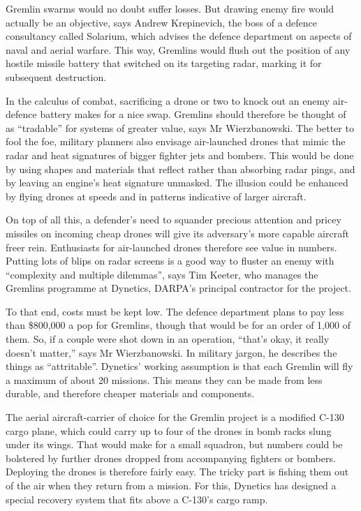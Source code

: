 \documentclass{article}
\begin{document}
Gremlin swarms would no doubt suffer losses. But drawing enemy fire would actually be an objective, says Andrew Krepinevich, the boss of a defence consultancy called Solarium, which advises the defence department on aspects of naval and aerial warfare. This way, Gremlins would flush out the position of any hostile missile battery that switched on its targeting radar, marking it for subsequent destruction. 

In the calculus of combat, sacrificing a drone or two to knock out an enemy air-defence battery makes for a nice swap. Gremlins should therefore be thought of as ``tradable'' for systems of greater value, says Mr Wierzbanowski. The better to fool the foe, military planners also envisage air-launched drones that mimic the radar and heat signatures of bigger fighter jets and bombers. This would be done by using shapes and materials that reflect rather than absorbing radar pings, and by leaving an engine's heat signature unmasked. The illusion could be enhanced by flying drones at speeds and in patterns indicative of larger aircraft. 

On top of all this, a defender's need to squander precious attention and pricey missiles on incoming cheap drones will give its adversary's more capable aircraft freer rein. Enthusiasts for air-launched drones therefore see value in numbers. Putting lots of blips on radar screens is a good way to fluster an enemy with ``complexity and multiple dilemmas'', says Tim Keeter, who manages the Gremlins programme at Dynetics, DARPA's principal contractor for the project. 

To that end, costs must be kept low. The defence department plans to pay less than \$800,000 a pop for Gremlins, though that would be for an order of 1,000 of them. So, if a couple were shot down in an operation, ``that's okay, it really doesn't matter,'' says Mr Wierzbanowski. In military jargon, he describes the things as ``attritable''. Dynetics' working assumption is that each Gremlin will fly a maximum of about 20 missions. This means they can be made from less durable, and therefore cheaper materials and components. 

The aerial aircraft-carrier of choice for the Gremlin project is a modified C-130 cargo plane, which could carry up to four of the drones in bomb racks slung under its wings. That would make for a small squadron, but numbers could be bolstered by further drones dropped from accompanying fighters or bombers. Deploying the drones is therefore fairly easy. The tricky part is fishing them out of the air when they return from a mission. For this, Dynetics has designed a special recovery system that fits above a C-130's cargo ramp. 
\end{document}

